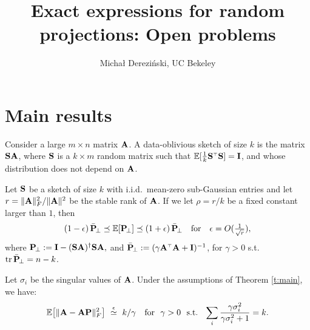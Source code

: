 \documentclass[11pt]{article}
\title{Exact expressions for random projections: Open problems}
\author{Micha{\l} Derezi\'nski, UC Bekeley}
\begin{document}
\maketitle

\section{Main results}
Consider a large $m\times n$
matrix $\A$. A data-oblivious sketch of size $k$ is the matrix $\S\A$,
where $\S$ is a $k\times m$ random matrix such that
$\E[\frac1k\S^\top\S]=\I$, and whose distribution does not
depend on $\A$.
\begin{theorem}\label{t:main}
Let $\S$ be a sketch of size $k$ with i.i.d.~mean-zero sub-Gaussian entries and let
  $r=\|\A\|_F^2/\|\A\|^2$ be the stable rank of $\A$.  If
  we let $\rho = r/k$ be a fixed constant larger than $1$, then
  \begin{align*}
    (1-\epsilon)\,\bar\P_{\!\perp}\preceq\E[\P_{\!\perp}]\preceq
    (1+\epsilon)\,\bar\P_{\!\perp}\quad\text{for}\quad \epsilon =
    O(\tfrac1{\sqrt r}),
  \end{align*}
  where $\P_{\!\perp} :=\I - (\S\A)^\dagger\S\A,$ and $\bar\P_{\!\perp}:=(\gamma\A^\top\A +
  \I)^{-1}$, for $\gamma>0$  s.t. $\tr\,\bar\P_{\!\perp} = n-k$.
\end{theorem}
\begin{corollary} %
  \label{c:low-rank}
Let $\sigma_i$ be the singular values of $\A$. Under the assumptions of Theorem \ref{t:main}, we have:\vspace{-1mm}
  \begin{align*}
    \E\big[\|\A-\A\P\|_F^2\big] \ \overset\epsilon\simeq\ 
    k/\gamma
\quad \text{for \ $\gamma>0$ \ s.t. \ } \sum_{i}\frac{\gamma\sigma_i^2}{\gamma\sigma_i^2+1} = k.
  \end{align*}
\end{corollary}
\end{document}

